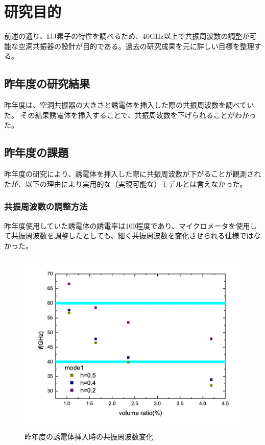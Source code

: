 \chapter{研究目的}
前述の通り、IJJ素子の特性を調べるため、40GHz以上で共振周波数の調整が可能な空洞共振器の設計が目的である。過去の研究成果を元に詳しい目標を整理する。

\section{昨年度の研究結果}
昨年度は、空洞共振器の大きさと誘電体を挿入した際の共振周波数を調べていた。\cite{わたなべ}
その結果誘電体を挿入することで、共振周波数を下げられることがわかった。

\section{昨年度の課題}
昨年度の研究により、誘電体を挿入した際に共振周波数が下がることが観測されたが、以下の理由により実用的な（実現可能な）モデルとは言えなかった。


\subsection{共振周波数の調整方法}
昨年度使用していた誘電体の誘電率は100程度であり、マイクロメータを使用して共振周波数を調整したとしても、細く共振周波数を変化させられる仕様ではなかった。

\vspace{10 mm}

\begin{figure}[h]
  \begin{center}
    \includegraphics[width=12cm]{./image/watanabe.png}
    \caption{昨年度の誘電体挿入時の共振周波数変化}
    \label{fig:Watanabe}
  \end{center}
\end{figure}

